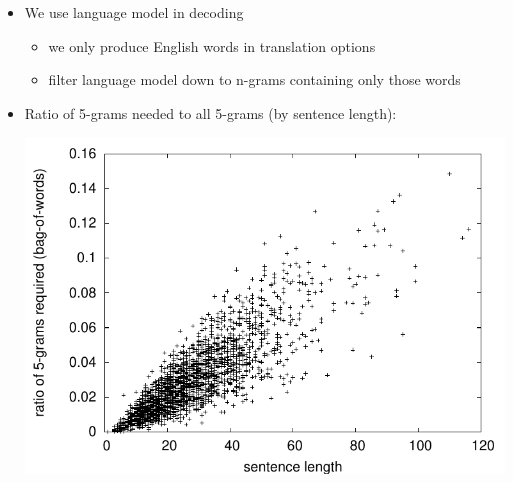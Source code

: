 \documentclass[landscape]{slides}
\begin{document}

\begin{itemize}
\item We use language model in decoding
\begin{itemize}
\item we only produce English words in translation options
\item filter language model down to n-grams containing only those words
\end{itemize}
\vspace{-3mm}
\item Ratio of 5-grams needed to all 5-grams (by sentence length):
\vspace{-6mm}
\begin{center}
\includegraphics[scale=1]{l-s5.pdf}
\end{center} \vspace{-3mm}
\end{itemize}

\end{document}
